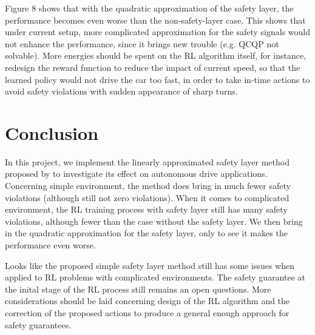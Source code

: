 \documentclass{article} %
\begin{document}
Figure 8 shows that with the quadratic approximation of the safety layer, the performance becomes even worse than the non-safety-layer case. This shows that under current setup, more complicated approximation for the safety signals would not enhance the performance, since it brings new trouble (e.g. QCQP not solvable). More energies should be spent on the RL algorithm itself, for instance, redesign the reward function to reduce the impact of current speed, so that the learned policy would not drive the car too fast, in order to take in-time actions to avoid safety violations with sudden appearance of sharp turns.

\section{Conclusion}
In this project, we implement the linearly approximated safety layer method proposed by \cite{dalal2018safe} to investigate its effect on autonomous drive applications. Concerning simple environment, the method does bring in much fewer safety violations (although still not zero violations). When it comes to complicated environment, the RL training process with safety layer still has many safety violations, although fewer than the case without the safety layer. We then bring in the quadratic approximation for the safety layer, only to see it makes the performance even worse.

Looks like the proposed simple safety layer method still has some issues when applied to RL problems with complicated environments. The safety guarantee at the inital stage of the RL process still remains an open questions. More considerations should be laid concerning design of the RL algorithm and the correction of the proposed actions to produce a general enough approach for safety guarantees.




\end{document}
